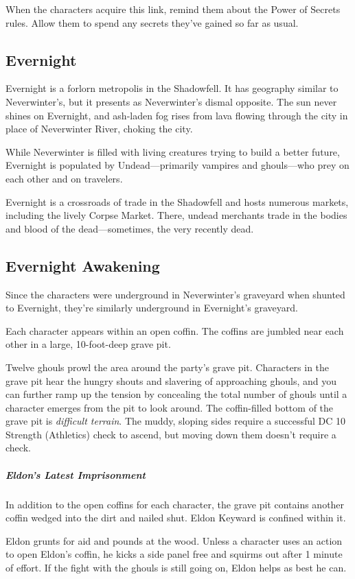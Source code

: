 \documentclass[10pt,a4paper,twoside,bg=print,twocolumn,openany,nodeprecatedcode]{dndbook}
\begin{document}
When the characters acquire this link, remind them about the Power of Secrets rules. Allow them to spend any secrets they've gained so far as usual.

\subsection{Evernight}
Evernight is a forlorn metropolis in the Shadowfell. It has geography similar to Neverwinter's, but it presents as Neverwinter's dismal opposite. The sun never shines on Evernight, and ash-laden fog rises from lava flowing through the city in place of Neverwinter River, choking the city.

While Neverwinter is filled with living creatures trying to build a better future, Evernight is populated by Undead—primarily vampires and ghouls—who prey on each other and on travelers.

Evernight is a crossroads of trade in the Shadowfell and hosts numerous markets, including the lively Corpse Market. There, undead merchants trade in the bodies and blood of the dead—sometimes, the very recently dead.

\subsection{Evernight Awakening}
Since the characters were underground in Neverwinter's graveyard when shunted to Evernight, they're similarly underground in Evernight's graveyard.

Each character appears within an open coffin. The coffins are jumbled near each other in a large, 10-foot-deep grave pit.

Twelve ghouls prowl the area around the party's grave pit. Characters in the grave pit hear the hungry shouts and slavering of approaching ghouls, and you can further ramp up the tension by concealing the total number of ghouls until a character emerges from the pit to look around. The coffin-filled bottom of the grave pit is \textit{difficult terrain}. The muddy, sloping sides require a successful DC 10 Strength (Athletics) check to ascend, but moving down them doesn't require a check.

\subparagraph{Eldon's Latest Imprisonment}
In addition to the open coffins for each character, the grave pit contains another coffin wedged into the dirt and nailed shut. Eldon Keyward is confined within it.

Eldon grunts for aid and pounds at the wood. Unless a character uses an action to open Eldon's coffin, he kicks a side panel free and squirms out after 1 minute of effort. If the fight with the ghouls is still going on, Eldon helps as best he can.
\end{document}
